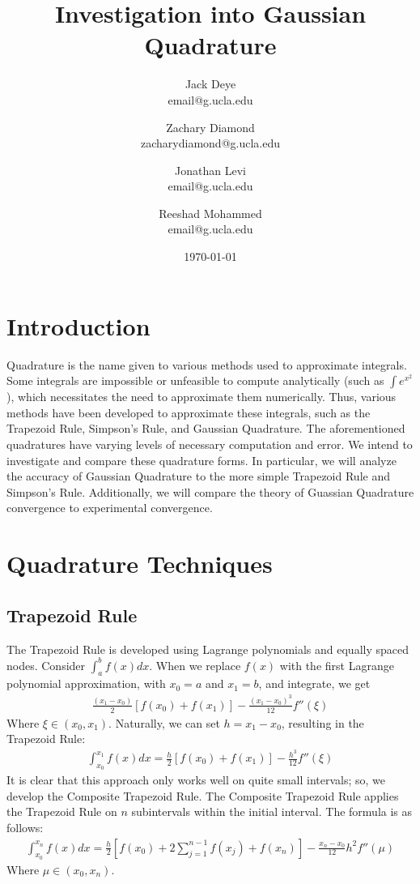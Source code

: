 \documentclass[12pt]{article}
\title{Investigation into Gaussian Quadrature}
\author{
    Jack Deye\\
    email@g.ucla.edu
    \and
    Zachary Diamond\\
    zacharydiamond@g.ucla.edu
    \and
    Jonathan Levi\\
    email@g.ucla.edu
    \and
    Reeshad Mohammed\\
    email@g.ucla.edu
}
\date{\today}
\begin{document}
\maketitle

\tableofcontents

\newpage

\section{Introduction}

Quadrature is the name given to various methods used to approximate integrals. Some integrals are
impossible or unfeasible to compute analytically (such as $\int e^{x^2}$), which necessitates the need to approximate them numerically.
Thus, various methods have been developed to approximate these integrals, such as the Trapezoid Rule, Simpson's Rule, and Gaussian Quadrature.
The aforementioned quadratures have varying levels of necessary computation and error. We intend to investigate and compare these quadrature forms.
In particular, we will analyze the accuracy of Gaussian Quadrature to the more simple Trapezoid Rule and Simpson's Rule.
Additionally, we will compare the theory of Guassian Quadrature convergence to experimental convergence.

\section{Quadrature Techniques}
\subsection{Trapezoid Rule}
The Trapezoid Rule is developed using Lagrange polynomials and equally spaced nodes. Consider $\int_a^b f(x)dx$. When we replace $f(x)$
with the first Lagrange polynomial approximation, with $x_0 = a$ and $x_1 = b$, and integrate, we get
\begin{align*}
    \frac{(x_1 - x_0)}{2}[f(x_0) + f(x_1)] - \frac{(x_1 - x_0)^3}{12}f''(\xi)
\end{align*}
Where $\xi \in (x_0, x_1)$. Naturally, we can set $h = x_1 - x_0$, resulting in the Trapezoid Rule:
\begin{align*}
    \int_{x_0}^{x_1}f(x)dx = \frac{h}{2}[f(x_0) + f(x_1)] - \frac{h^3}{12}f''(\xi)
\end{align*}
It is clear that this approach only works well on quite small intervals; so, we develop the Composite Trapezoid Rule. The Composite Trapezoid Rule
applies the Trapezoid Rule on $n$ subintervals within the initial interval. The formula is as follows:
\begin{align*}
    \int_{x_0}^{x_n}f(x)dx = \frac{h}{2}[f(x_0) + 2\sum_{j=1}^{n-1}f(x_j) + f(x_n)] - \frac{x_n - x_0}{12}h^2f''(\mu)
\end{align*}
Where $\mu \in (x_0, x_n)$.
\end{document}
